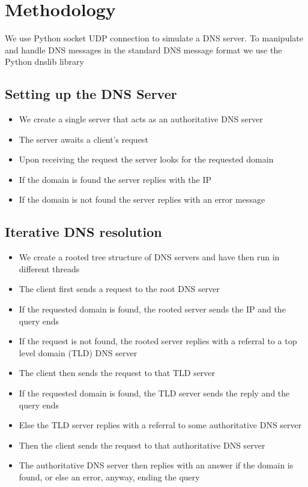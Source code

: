 \documentclass[11pt]{article}
\begin{document}
\section{Methodology}
We use Python socket UDP connection to simulate a DNS server. To manipulate and handle DNS messages in the standard DNS
message format we use the Python dnslib library
    \subsection{Setting up the DNS Server}
        \begin{itemize}
            \item We create a single server that acts as an authoritative DNS server
            \item The server awaits a client's request
            \item Upon receiving the request the server looks for the requested domain
            \item If the domain is found the server replies with the IP
            \item If the domain is not found the server replies with an error message
        \end{itemize}
    \subsection{Iterative DNS resolution}
        \begin{itemize}
            \item We create a rooted tree structure of DNS servers and have then run in different threads
            \item The client first sends a request to the root DNS server
            \item If the requested domain is found, the rooted server sends the IP and the query ends
            \item If the request is not found, the rooted server replies with a referral to a top level domain (TLD) DNS server
            \item The client then sends the request to that TLD server
            \item If the requested domain is found, the TLD server sends the reply and the query ends
            \item Else the TLD server replies with a referral to some authoritative DNS server
            \item Then the client sends the request to that authoritative DNS server
            \item The authoritative DNS server then replies with an answer if the domain is found, or else an error, anyway, ending the query
        \end{itemize}
\end{document}
